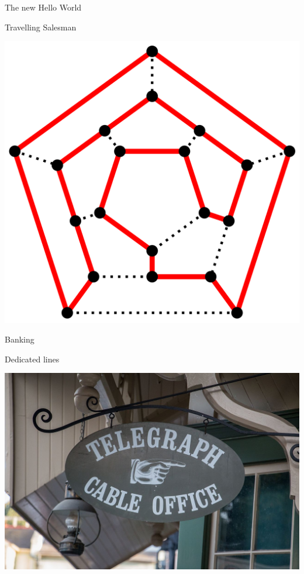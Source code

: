 \documentclass[presentation]{beamer}
\begin{document}
\begin{frame}[label={sec:org66acbfc}]{The new Hello World}
\begin{block}{Travelling Salesman}
\begin{center}
\includegraphics[width=.9\linewidth]{2000px-Hamiltonian_path.svg.png}
\end{center}
\end{block}
\end{frame}
\begin{frame}[label={sec:orge85e13e}]{Banking}
\begin{block}{Dedicated lines}
\begin{center}
\includegraphics[width=.9\linewidth]{Telegraph_Cable_Office.jpg}
\end{center}
\end{block}
\end{frame}
\end{document}

